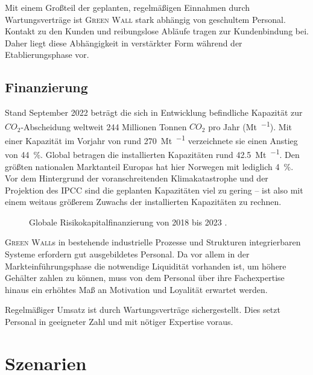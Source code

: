 Mit einem Großteil der geplanten, regelmäßigen Einnahmen durch Wartungsverträge ist \textsc{Green Wall} stark abhängig von geschultem Personal.
Kontakt zu den Kunden und reibungslose Abläufe tragen zur Kundenbindung bei.
Daher liegt diese Abhängigkeit in verstärkter Form während der Etablierungsphase vor.\par


\subsection{Finanzierung}

Stand September 2022 beträgt die sich in Entwicklung befindliche Kapazität zur \(CO_2\)-Abscheidung weltweit \num{244} Millionen Tonnen \(CO_2\) pro Jahr (\unit{\mega\tonne\per\an}).
Mit einer Kapazität im Vorjahr von rund \qty{270}{\mega\tonne\per\an} verzeichnete sie einen Anstieg von \qty{44}{\percent}.
Global betragen die installierten Kapazitäten rund \qty{42.5}{\mega\tonne\per\an}.
Den größten nationalen Marktanteil Europas hat hier Norwegen mit lediglich \qty{4}{\percent}.
Vor dem Hintergrund der voranschreitenden Klimakatastrophe und der Projektion des IPCC sind die geplanten Kapazitäten viel zu gering -- ist also mit einem weitaus größerem Zuwachs der installierten Kapazitäten zu rechnen\cite{Book.EJR.CARBONCAPTUREUTILISATIONANDSTORAGEINTHEEUROPEANUNION.2023}.\par\medskip
%
\begin{figure}[h]
    \centering
    
    \caption[Globale Risikokapitalfinanzierung von 2018 bis 2023]{Globale Risikokapitalfinanzierung von 2018 bis 2023 \cite{Statista2022.GlobalVentureCapital}.}\label{fig:glob ccus vc inv}
\end{figure}

\textsc{Green Wall}s in bestehende industrielle Prozesse und Strukturen integrierbaren Systeme erfordern gut ausgebildetes Personal.
Da vor allem in der Markteinführungsphase die notwendige Liquidität vorhanden ist, um höhere Gehälter zahlen zu können, muss von dem Personal über ihre Fachexpertise hinaus ein erhöhtes Maß an Motivation und Loyalität erwartet werden.\par\medskip

Regelmäßiger Umsatz ist durch Wartungsverträge sichergestellt.
Dies setzt Personal in geeigneter Zahl und mit nötiger Expertise voraus.

\section{Szenarien}

